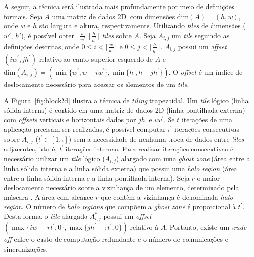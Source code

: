 A seguir, a técnica será ilustrada mais profundamente
por meio de definições formais. Seja $A$ uma matriz de dados 2D, com dimensões
$\textrm{dim}(A) = (h,w)$, onde $w$ e $h$ são largura e altura, respectivamente.
Utilizando \textit{tiles} de dimensões ($w'$, $h'$), é possível obter
$\lceil\frac{w}{w^\prime}\rceil\lceil\frac{h}{h^\prime}\rceil$ \textit{tiles}
sobre $A$. Seja $A_{i,j}$ um \textit{tile} seguindo as definições descritas,
onde $0 \leq i < \lceil\frac{w}{w^\prime}\rceil$ e $0\leq j <
\lceil\frac{h}{h^\prime}\rceil$. $A_{i,j}$ possui um \textit{offset} $(i
w^\prime, j h^\prime)$ relativo ao canto superior esquerdo de $A$ e
$\textrm{dim}(A_{i,j}) = (\min\{w^\prime, w-i w^\prime\}, \min\{h^\prime, h-j
h^\prime\})$. O \textit{offset} é um índice de deslocamento necessário para
acessar os elementos de um \textit{tile}.

A Figura~\ref{fig:block2d} ilustra a técnica de \textit{tiling} trapezoidal. Um
\textit{tile} lógico (linha sólida interna) é contido em uma matriz de dados 2D
(linha pontilhada externa) com \textit{offsets} verticais e horizontais dados
por $jh^\prime$ e $iw^\prime$. Se $t$ iterações de uma aplicação \stencil
precisam ser realizadas, é possível computar $t^\prime$ iterações consecutivas
sobre $A_{i,j}$ ($t^\prime \in \left[1,t\right]$) sem a necessidade de nenhuma
troca de dados entre \textit{tiles} adjacentes, isto é, $t^\prime$ iterações
internas. Para realizar iterações consecutivas é necessário utilizar um
\textit{tile} lógico ($A_{i,j}$) alargado com uma \textit{ghost zone} (área
entre a linha sólida interna e a linha sólida externa) que possui uma
\textit{halo region} (área entre a linha sólida interna e a linha pontilhada
interna). Seja $r$ o maior deslocamento necessário sobre a vizinhança de um
elemento, determinado pela máscara \stencil. A área com alcance $r$ que contém a
vizinhança é denominada \textit{halo region}. O número de \textit{halo regions}
que compõem a \textit{ghost zone} é proporcional à $t^\prime$. Desta forma, o
\textit{tile} alargado $A^\ast_{i,j}$ possui um \textit{offset} $(\max\{iw^\prime -
rt^\prime, 0\}, \max\{jh^\prime - rt^\prime, 0\})$ relativo à $A$. Portanto,
existe um \textit{trade-off} entre o custo de computação redundante e o número
de comunicações e sincronizações.

